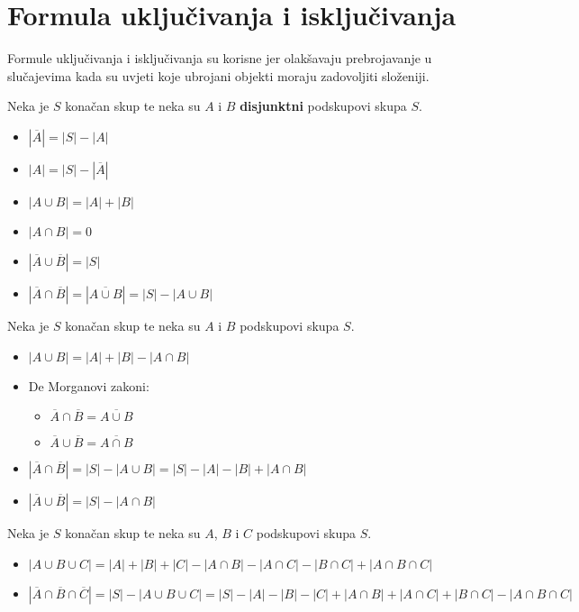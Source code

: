 \section{Formula uključivanja i isključivanja}

Formule uključivanja i isključivanja su korisne jer olakšavaju prebrojavanje u
slučajevima kada su uvjeti koje ubrojani objekti moraju zadovoljiti složeniji.

Neka je $S$ konačan skup te neka su $A$ i $B$ \textbf{disjunktni} podskupovi skupa $S$.

\begin{itemize}
    \item $|\overline{A}| = |S| - |A|$
    \item $|A| = |S| - |\overline{A}|$
    \item $|A \cup B| = |A| + |B|$
    \item $|A \cap B| = 0$
    \item $|\overline{A} \cup \overline{B}| = |S|$
    \item $|\overline{A} \cap \overline{B}| = |\overline{A \cup B}| = |S| - |A \cup B|$
\end{itemize}

Neka je $S$ konačan skup te neka su $A$ i $B$ podskupovi skupa $S$.

\begin{itemize}
    \item $|A \cup B| = |A| + |B| - |A \cap B|$
    \item De Morganovi zakoni:
    \begin{itemize}
        \item $\overline{A} \cap \overline{B} = \overline{A \cup B}$
        \item $\overline{A} \cup \overline{B} = \overline{A \cap B}$
    \end{itemize}
    \item $|\overline{A}\cap \overline{B}| = |S| - |A \cup B| = |S| - |A| - |B| + |A \cap B|$
    \item $|\overline{A}\cup \overline{B}| = |S| - |A \cap B|$
\end{itemize}

Neka je $S$ konačan skup te neka su $A$, $B$ i $C$ podskupovi skupa $S$.

\begin{itemize}
    \item $|A \cup B \cup C| = |A| + |B| + |C| - |A \cap B| - |A\cap C| - |B \cap C| + |A\cap B \cap C|$
    \item $|\overline{A}\cap \overline{B} \cap \overline{C}| = |S| - |A \cup B \cup C| = |S| - |A| - |B| - |C| + |A \cap B| + |A \cap C| + |B \cap C| - |A \cap B \cap C|$
\end{itemize}

